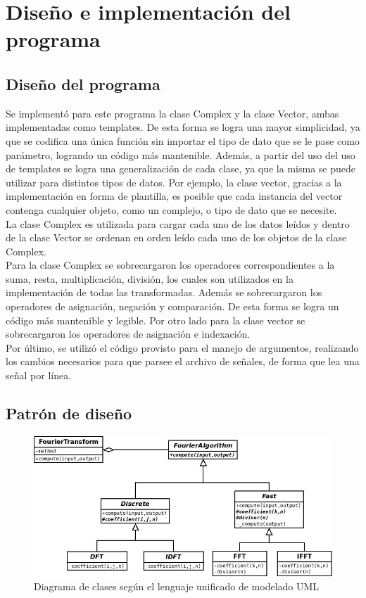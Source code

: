 \documentclass[12pt,a4paper]{report}
\begin{document}
	\section{Diseño e implementación del programa}	
	
        \subsection{Diseño del programa}
            \indent Se implementó para este programa la clase Complex y la clase Vector, ambas implementadas como templates.
            De esta forma se logra una mayor simplicidad, ya que se codifica una única función sin importar el tipo de dato que
            se le pase como parámetro, logrando un código más mantenible. Además, a partir del uso del uso de templates se logra una
            generalización de cada clase, ya que la misma se puede utilizar para distintos tipos de datos. Por ejemplo, la clase vector,
            gracias a la implementación en forma de plantilla, es posible que cada instancia del vector contenga cualquier objeto, como
            un complejo, o tipo de dato que se necesite. 
            \\
            \indent La clase Complex es utilizada para cargar cada uno de los datos leídos y dentro de la clase Vector se ordenan en
            orden leído cada uno de los objetos de la clase Complex. 
   			\\
			\indent Para la clase Complex se sobrecargaron los operadores correspondientes a la suma, resta, multiplicación, 
			división, los cuales son utilizados en la implementación de todas las transformadas. Además se sobrecargaron los operadores
			de asignación, negación y comparación. De esta forma se logra un código más mantenible y legible. Por otro lado para 
			la clase vector se sobrecargaron los operadores de asignación e indexación. 
			\\
			\indent Por último, se utilizó el código provisto para el manejo de argumentos,	realizando los cambios necesarios para que 
			parsee el archivo de señales, de forma que lea una señal por línea.

		\subsection{Patrón de diseño}
			
			\begin{figure}[H]
				\centering
					\includegraphics[scale=0.55]{diagrama_de_clases.jpg}
				\caption{Diagrama de clases según el lenguaje unificado de modelado UML}
			\end{figure}
			
\end{document}
